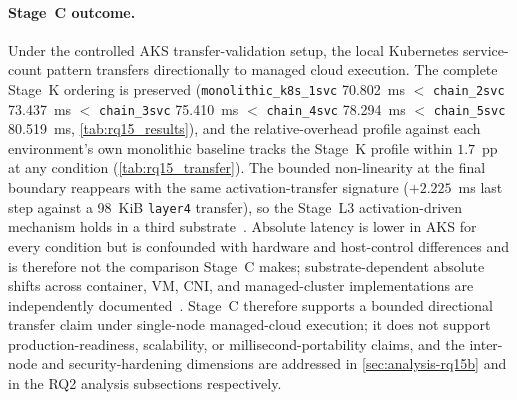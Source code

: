 \paragraph{Stage~C outcome.}
Under the controlled AKS transfer-validation setup, the local Kubernetes
service-count pattern transfers directionally to managed cloud
execution. The complete Stage~K ordering is preserved
(\texttt{monolithic\_k8s\_1svc} 70.802~ms $<$ \texttt{chain\_2svc}
73.437~ms $<$ \texttt{chain\_3svc} 75.410~ms $<$ \texttt{chain\_4svc}
78.294~ms $<$ \texttt{chain\_5svc} 80.519~ms,
\cref{tab:rq15_results}), and the relative-overhead profile against
each environment's own monolithic baseline tracks the Stage~K profile
within $1.7$~pp at any condition (\cref{tab:rq15_transfer}). The
bounded non-linearity at the final boundary reappears with the same
activation-transfer signature ($+2.225$~ms last step against a 98~KiB
\texttt{layer4} transfer), so the Stage~L3 activation-driven mechanism
holds in a third substrate~\cite{deeperthings}. Absolute latency is
lower in AKS for every condition but is confounded with hardware and
host-control differences and is therefore not the comparison Stage~C
makes; substrate-dependent absolute shifts across container, VM, CNI,
and managed-cluster implementations are independently
documented~\cite{managed_k8s_perf,virtualization_costs,cni_k8s_ic2e21,
noise_in_clouds}. Stage~C therefore supports a bounded directional
transfer claim under single-node managed-cloud execution; it does not
support production-readiness, scalability, or millisecond-portability
claims, and the inter-node and security-hardening dimensions are
addressed in \cref{sec:analysis-rq15b} and in the RQ2 analysis
subsections respectively.
